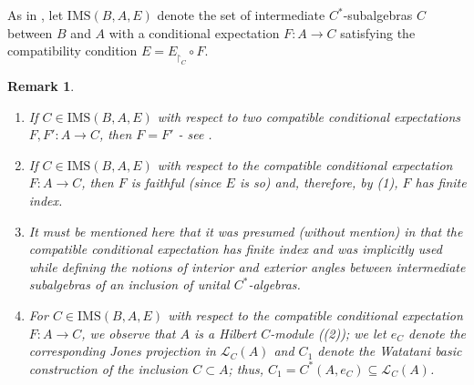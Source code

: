 \documentclass[a4]{amsart}
\newtheorem{remark}[theorem]{\bf Remark}
\numberwithin{equation}{section}
\begin{document}
As in \cite{IW}, let $\mathrm{IMS}(B, A, E)$ denote the set of
intermediate $C^*$-subalgebras $C$ between $B$ and $ A$ with a
 conditional expectation $F: A\to C$ satisfying the
 compatibility condition $E= E_{\restriction_C} \circ F$.
 \begin{remark}\label{IMS-facts}
  \begin{enumerate}
\item  If $C \in \mathrm{IMS}(B, A, E)$      with respect to two compatible conditional expectations $F, F': A \to C$,
    then $F = F'$ - see \cite[Page 3]{IW}.

  \item   If $C \in \mathrm{IMS}(B, A, E)$ with respect to the
      compatible conditional expectation $F: A \to C$, then $F$ is faithful (since $E$ is so) and, therefore, by
 (1), $F$ has finite index.

  \item It must be mentioned here that it was presumed (without mention) in \cite{BG2}
    that the compatible conditional expectation has finite index and
    was implicitly used while defining the notions of interior and exterior
    angles between intermediate subalgebras of an inclusion of unital
    $C^*$-algebras.
\item For $C \in \mathrm{IMS}(B, A, E)$ with respect to the compatible conditional
expectation $F: A \to C$, we observe that $A$ is a Hilbert $C$-module
((2)); we let $e_C$ denote the corresponding Jones
projection in $\mathcal{L}_C(A)$ and $C_1$ denote the Watatani
basic construction of the inclusion $C \subset A$; thus, $C_1= C^*(A,
e_C) \subseteq \mathcal{L}_C(A)$.
  \end{enumerate}
 \end{remark}
 
\end{document}

